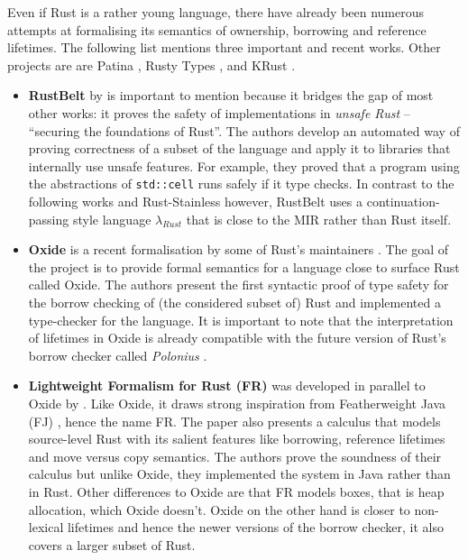Even if Rust is a rather young language, there have already been
numerous attempts at formalising its semantics of ownership, borrowing
and reference lifetimes. The following list mentions three important and
recent works. Other projects are are Patina \cite{patina}, Rusty
Types \cite{rusty-types}, and KRust \cite{krust}.

\begin{itemize}
\item
  \textbf{RustBelt} by \citet{rustbelt} is important to mention because
  it bridges the gap of most other works: it proves the safety of
  implementations in \emph{unsafe Rust} -- ``securing the foundations of
  Rust''. The authors develop an automated way of proving correctness of
  a subset of the language and apply it to libraries that internally use
  unsafe features. For example, they proved that a program using the
  abstractions of \passthrough{\lstinline!std::cell!} runs safely if it
  type checks. In contrast to the following works and Rust-Stainless
  however, RustBelt uses a continuation-passing style language
  \(\lambda_{Rust}\) that is close to the MIR rather than Rust itself.

\item
  \textbf{Oxide} is a recent formalisation by some of Rust's maintainers
  \citet{oxide}. The goal of the project is to provide formal semantics
  for a language close to surface Rust called Oxide. The authors present
  the first syntactic proof of type safety for the borrow checking of
  (the considered subset of) Rust and implemented a type-checker for the
  language. It is important to note that the interpretation of lifetimes
  in Oxide is already compatible with the future version of Rust's
  borrow checker called \emph{Polonius} \cite{polonius}.

\item
  \textbf{Lightweight Formalism for Rust (FR)} was developed in parallel
  to Oxide by \citet{fr}. Like Oxide, it draws strong inspiration from
  Featherweight Java (FJ) \cite{fj}, hence the name FR. The paper also
  presents a calculus that models source-level Rust with its salient
  features like borrowing, reference lifetimes and move versus copy
  semantics. The authors prove the soundness of their calculus but
  unlike Oxide, they implemented the system in Java rather than in Rust.
  Other differences to Oxide are that FR models boxes, that is heap
  allocation, which Oxide doesn't. Oxide on the other hand is closer to
  non-lexical lifetimes and hence the newer versions of the borrow
  checker, it also covers a larger subset of Rust.
\end{itemize}

